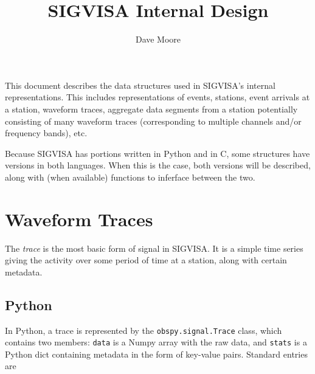\documentclass{article}
\begin{document}
\title{SIGVISA Internal Design}
\author{Dave Moore}
\date{}

This document describes the data structures used in SIGVISA's internal representations. This includes representations of events, stations, event arrivals at a station, waveform traces, aggregate data segments from a station potentially consisting of many waveform traces (corresponding to multiple channels and/or frequency bands), etc.


Because SIGVISA has portions written in Python and in C, some structures have versions in both languages. When this is the case, both versions will be described, along with (when available) functions to inferface between the two. 

\section{Waveform Traces}

The {\em trace} is the most basic form of signal in SIGVISA. It is a simple time series giving the activity over some period of time at a station, along with certain metadata.

\subsection{Python}

In Python, a trace is represented by the {\tt obspy.signal.Trace} class, which contains two members: {\tt data} is a Numpy array with the raw data, and {\tt stats} is a Python dict containing metadata in the form of key-value pairs. Standard entries are
\end{document}
